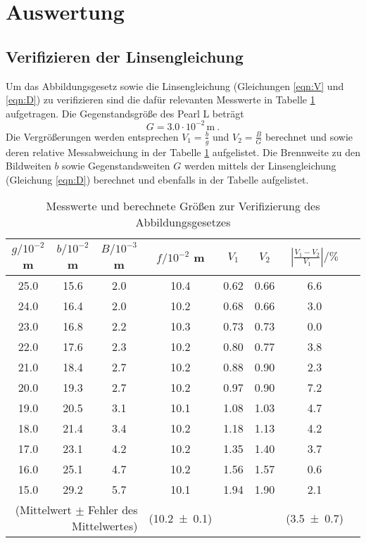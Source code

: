 \section{Auswertung}
\label{sec:Auswertung}
\subsection{Verifizieren der Linsengleichung}
Um das Abbildungsgesetz sowie die Linsengleichung (Gleichungen \eqref{eqn:V} und \eqref{eqn:D}) zu verifizieren sind die dafür relevanten Messwerte in Tabelle \ref{tab:VdA} aufgetragen. Die Gegenstandsgröße des Pearl L beträgt 
\begin{equation}
  G = 3.0 \cdot 10^{-2} \, \text{m} \ .
\end{equation} 
Die Vergrößerungen werden entsprechen $V_1 = \frac{b}{g}$ und $V_2 = \frac{B}{G}$ berechnet und sowie deren relative Messabweichung in der Tabelle \ref{tab:VdA} aufgelistet. Die Brennweite zu den Bildweiten $b$ sowie Gegenstandsweiten $G$ werden mittels der Linsengleichung (Gleichung \eqref{eqn:D}) berechnet und ebenfalls in der Tabelle aufgelistet. 
\begin{table}
  \centering
  \begin{tabular}{c c c | c | c c c c}
    \toprule
    $g / 10^{-2}$ m & $b / 10^{-2}$ m & $B / 10^{-3}$ m & $f / 10^{-2}$ m & $V_1$ & $V_2$ & $\left\lvert \frac{V_1 - V_2}{V_1} \right\rvert / \% $\\
   \midrule
    25.0 & 15.6 & 2.0 & 10.4 & 0.62   & 0.66	& 6.6 	\\
    24.0 & 16.4 & 2.0 & 10.2 & 0.68   & 0.66	& 3.0	\\
    23.0 & 16.8 & 2.2 & 10.3 & 0.73   & 0.73	& 0.0	\\
    22.0 & 17.6 & 2.3 & 10.2 & 0.80   & 0.77	& 3.8	\\
    21.0 & 18.4 & 2.7 & 10.2 & 0.88   & 0.90	& 2.3	\\
    20.0 & 19.3 & 2.7 & 10.2 & 0.97   & 0.90	& 7.2	\\
    19.0 & 20.5 & 3.1 & 10.1 & 1.08   & 1.03	& 4.7	\\
    18.0 & 21.4 & 3.4 & 10.2 & 1.18   & 1.13	& 4.2	\\
    17.0 & 23.1 & 4.2 & 10.2 & 1.35   & 1.40	& 3.7	\\
    16.0 & 25.1 & 4.7 & 10.2 & 1.56   & 1.57	& 0.6	\\
    15.0 & 29.2 & 5.7 & 10.1 & 1.94   & 1.90	& 2.1	\\
    \midrule
    \multicolumn{3}{r|}{(Mittelwert $\pm$ Fehler des Mittelwertes)}&(\num {10.2 +- 0.1}) & & & (\num{3.5 +- 0.7})\\
    \bottomrule
  \end{tabular}
  \caption{Messwerte und berechnete Größen zur Verifizierung des Abbildungsgesetzes}
  \label{tab:VdA}
\end{table}
